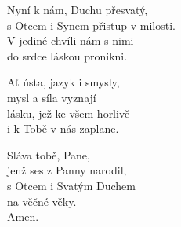 \begin{translatioMulticol}{3}
Nyní k nám, Duchu přesvatý,\\
s Otcem i Synem přistup v milosti.\\
V jediné chvíli nám s nimi\\
do srdce láskou pronikni.\columnbreak

Ať ústa, jazyk i smysly,\\
mysl a síla vyznají\\
lásku, jež ke všem horlivě\\
i k Tobě v nás zaplane.\columnbreak

Sláva tobě, Pane,\\
jenž ses z Panny narodil,\\
s Otcem i Svatým Duchem\\
na věčné věky.\\
Amen.
\end{translatioMulticol}
